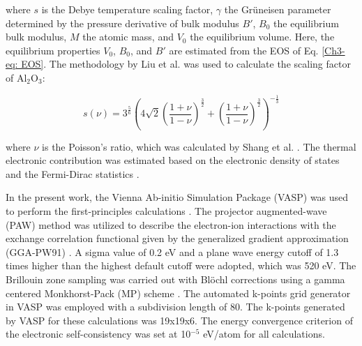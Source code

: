 \noindent where $s$ is the Debye temperature scaling factor, $\gamma$ the Gr\"uneisen parameter determined by the pressure derivative of bulk modulus $B'$, $B_{0}$ the equilibrium bulk modulus, $M$ the atomic mass, and $V_{0}$ the equilibrium volume. Here, the equilibrium properties $V_{0}$, $B_{0}$, and $B'$ are estimated from the EOS of Eq. \ref{Ch3-eq: EOS}. The methodology by Liu et al. \cite{Liu2015} was used to calculate the scaling factor of Al$_{2}$O$_{3}$: 

\begin{equation}
\label{Ch3-eq: scalingfactor}
s(\nu) = 3^{\frac{5}{6}} \left( 4 \sqrt{2} \left(\frac{1+\nu}{1-\nu}\right)^{\frac{3}{2}} + \left(\frac{1+\nu}{1-\nu}\right)^{\frac{3}{2}}\right)^{-\frac{1}{3}}
\end{equation}

\noindent where $\nu$ is the Poisson's ratio, which was calculated by Shang et al. \cite{Shang2007c}. The thermal electronic contribution was estimated based on the electronic density of states and the Fermi-Dirac statistics \cite{Wang2004}.

In the present work, the Vienna Ab-initio Simulation Package (VASP) was used to perform the first-principles calculations \cite{Kresse1996}. The projector augmented-wave (PAW) \cite{Kresse1999,Blochl1994} method was utilized to describe the electron-ion interactions with the exchange correlation functional given by the generalized gradient approximation (GGA-PW91) \cite{Perdew1992}. A sigma value of 0.2 eV and a plane wave energy cutoff of 1.3 times higher than the highest default cutoff were adopted, which was 520 eV. The Brillouin zone sampling was carried out with Bl\"ochl corrections using a gamma centered Monkhorst-Pack (MP) scheme \cite{Blochl1994,Monkhorst1976a}. The automated k-points grid generator in VASP was employed with a subdivision length of 80. The k-points generated by VASP for these calculations was 19x19x6. The energy convergence criterion of the electronic self-consistency was set at 10$^{-5}$ eV/atom for all calculations.

